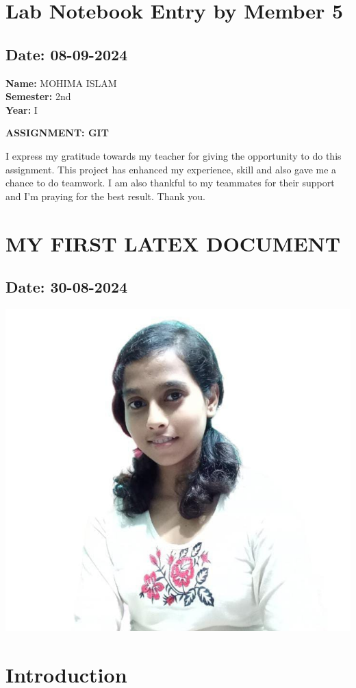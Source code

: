 \documentclass[12pt]{article}
\begin{document}
\section{Lab Notebook Entry by Member 5}
\subsection*{Date: 08-09-2024}

\begin{flushright}
\textbf{Name:} MOHIMA ISLAM \\
\textbf{Semester:} 2nd \\
\textbf{Year:} I \\
\end{flushright}

\begin{center}
\Huge \textbf{ASSIGNMENT: GIT}
\end{center}

I express my gratitude towards my teacher for giving the opportunity to do this assignment. This project has enhanced my experience, skill and also gave me a chance to do teamwork. I am also thankful to my teammates for their support and I'm praying for the best result. Thank you.
\newpage
\section{MY FIRST LATEX DOCUMENT}
\subsection*{Date: 30-08-2024}
 \begin{center}
        \includegraphics[width=0.5\linewidth]{mohima.jpg}
     \end{center}
\section{Introduction}
\end{document}

